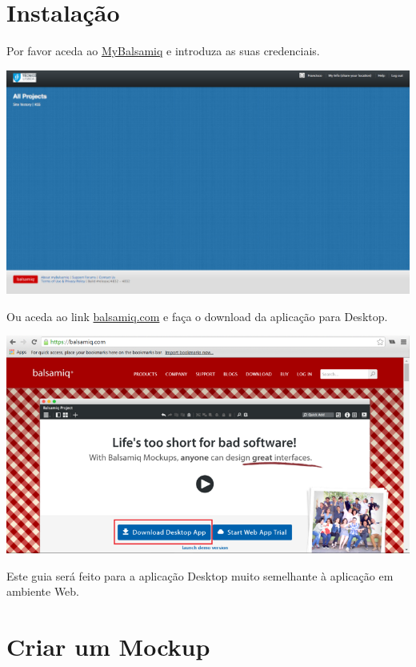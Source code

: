 \documentclass{tufte-book} %
\begin{document}
\mainmatter

\chapter{Instalação}

Por favor aceda ao \href{https://tecnico.mybalsamiq.com/}{MyBalsamiq} e introduza as suas credenciais.

\begin{center}
	\includegraphics{img25.png}
\end{center}

Ou aceda ao link \href{https://balsamiq.com/}{balsamiq.com} e faça o download da aplicação para Desktop.

\begin{center}
	\includegraphics{img2.png}
\end{center}

Este guia será feito para a aplicação Desktop muito semelhante à aplicação em ambiente Web.

\chapter{Criar um Mockup}
\end{document}

